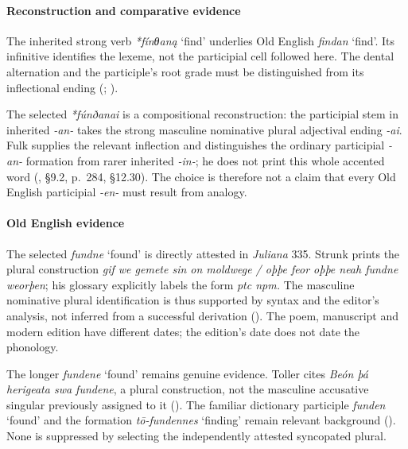 \documentclass[
  british,
  a4paper,
]{article}
\providecommand{\Recon}[1]{\emph{*#1}}
\begin{document}
\paragraph{Reconstruction and comparative
evidence}\label{reconstruction-and-comparative-evidence-130}

The inherited strong verb \Recon{fínθaną} `find' underlies Old English
{\emph{findan}} `find'. Its infinitive identifies the lexeme, not the
participial cell followed here. The dental alternation and the
participle's root grade must be distinguished from its inflectional
ending (;
).

The selected \Recon{fúnðanai} is a compositional reconstruction: the
participial stem in inherited \emph{-an-} takes the strong masculine
nominative plural adjectival ending \emph{-ai}. Fulk supplies the
relevant inflection and distinguishes the ordinary participial
\emph{-an-} formation from rarer inherited \emph{-in-}; he does not
print this whole accented word (,
§9.2, p.~284, §12.30). The choice is therefore not a claim that every
Old English participial \emph{-en-} must result from analogy.

\paragraph{Old English evidence}\label{old-english-evidence-132}

The selected {\emph{fundne}} `found' is directly attested in
\emph{Juliana} 335. Strunk prints the plural construction \emph{gif we
gemete sin on moldwege / oþþe feor oþþe neah fundne weorþen}; his
glossary explicitly labels the form \emph{ptc npm.} The masculine
nominative plural identification is thus supported by syntax and the
editor's analysis, not inferred from a successful derivation
(). The poem, manuscript
and modern edition have different dates; the edition's date does not
date the phonology.

The longer {\emph{fundene}} `found' remains genuine evidence. Toller
cites \emph{Beón þá herigeata swa fundene}, a plural construction, not
the masculine accusative singular previously assigned to it
(). The familiar dictionary
participle {\emph{funden}} `found' and the formation \emph{tō-fundennes}
`finding' remain relevant background (). None is suppressed by selecting the independently
attested syncopated plural.
\end{document}
